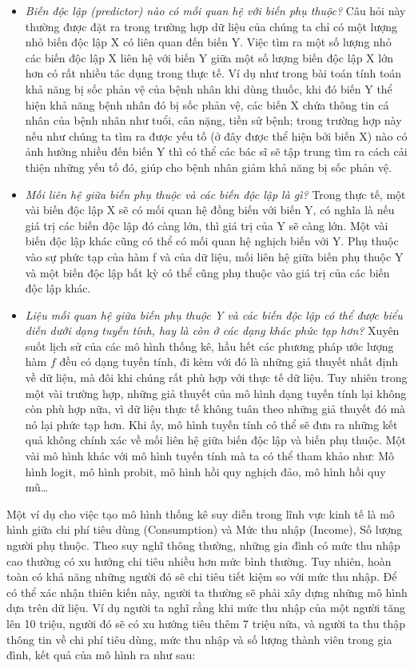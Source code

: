 \documentclass[
]{article}
\providecommand{\tightlist}{%
  \setlength{\itemsep}{0pt}\setlength{\parskip}{0pt}}
\begin{document}
\begin{itemize}
\tightlist
\item
  \emph{Biến độc lập (predictor) nào có mối quan hệ với biến phụ thuộc?} Câu hỏi này thường được đặt ra trong trường hợp dữ liệu của chúng ta chỉ có một lượng nhỏ biến độc lập X có liên quan đến biến Y. Việc tìm ra một số lượng nhỏ các biến độc lập X liên hệ với biến Y giữa một số lượng biến độc lập X lớn hơn có rất nhiều tác dụng trong thực tế. Ví dụ như trong bài toán tính toán khả năng bị sốc phản vệ của bệnh nhân khi dùng thuốc, khi đó biến Y thể hiện khả năng bệnh nhân đó bị sốc phản vệ, các biến X chứa thông tin cá nhân của bệnh nhân như tuổi, cân nặng, tiền sử bệnh; trong trường hợp này nếu như chúng ta tìm ra được yếu tố (ở đây được thể hiện bởi biến X) nào có ảnh hưởng nhiều đến biến Y thì có thể các bác sĩ sẽ tập trung tìm ra cách cải thiện những yếu tố đó, giúp cho bệnh nhân giảm khả năng bị sốc phản vệ.
\item
  \emph{Mối liên hệ giữa biến phụ thuộc và các biến độc lập là gì?} Trong thực tế, một vài biến độc lập X sẽ có mối quan hệ đồng biến với biến Y, có nghĩa là nếu giá trị các biến độc lập đó càng lớn, thì giá trị của Y sẽ càng lớn. Một vài biến độc lập khác cũng có thể có mối quan hệ nghịch biến với Y. Phụ thuộc vào sự phức tạp của hàm f và của dữ liệu, mối liên hệ giữa biến phụ thuộc Y và một biến độc lập bất kỳ có thể cũng phụ thuộc vào giá trị của các biến độc lập khác.
\item
  \emph{Liệu mối quan hệ giữa biến phụ thuộc Y và các biến độc lập có thể được biểu diễn dưới dạng tuyến tính, hay là còn ở các dạng khác phức tạp hơn?} Xuyên suốt lịch sử của các mô hình thống kê, hầu hết các phương pháp ước lượng hàm \(f\) đều có dạng tuyến tính, đi kèm với đó là những giả thuyết nhất định về dữ liệu, mà đôi khi chúng rất phù hợp với thực tế dữ liệu. Tuy nhiên trong một vài trường hợp, những giả thuyết của mô hình dạng tuyến tính lại không còn phù hợp nữa, vì dữ liệu thực tế không tuân theo những giả thuyết đó mà nó lại phức tạp hơn. Khi ấy, mô hình tuyến tính có thể sẽ đưa ra những kết quả không chính xác về mối liên hệ giữa biến độc lập và biến phụ thuộc. Một vài mô hình khác với mô hình tuyến tính mà ta có thể tham khảo như: Mô hình logit, mô hình probit, mô hình hồi quy nghịch đảo, mô hình hồi quy mũ\ldots{}
\end{itemize}

Một ví dụ cho việc tạo mô hình thống kê suy diễn trong lĩnh vực kinh tế là mô hình giữa chi phí tiêu dùng (Consumption) và Mức thu nhập (Income), Số lượng người phụ thuộc. Theo suy nghĩ thông thường, những gia đình có mức thu nhập cao thường có xu hướng chi tiêu nhiều hơn mức bình thường. Tuy nhiên, hoàn toàn có khả năng những người đó sẽ chi tiêu tiết kiệm so với mức thu nhập. Để có thể xác nhận thiên kiến này, người ta thường sẽ phải xây dựng những mô hình dựa trên dữ liệu. Ví dụ người ta nghĩ rằng khi mức thu nhập của một người tăng lên 10 triệu, người đó sẽ có xu hướng tiêu thêm 7 triệu nữa, và người ta thu thập thông tin về chi phí tiêu dùng, mức thu nhập và số lượng thành viên trong gia đình, kết quả của mô hình ra như sau:
\end{document}
